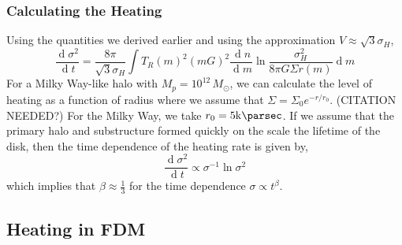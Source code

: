 \documentclass[usenatbib]{mnras}
\renewcommand{\d}[1]{\! \mathrm{d}#1 \:}
\newcommand{\deriv}[2]{\frac{\d{#1}}{\d{#2}}}
\renewcommand{\d}[1]{\ensuremath{\operatorname{d}\!{#1}}}
\begin{document}
\subsubsection{Calculating the Heating}
Using the quantities we derived earlier and using the approximation $V \approx \sqrt{3} \sigma_H$,
\begin{equation}
\deriv{\sigma^2}{t} = \frac{8 \pi}{\sqrt{3} \sigma_H} \int T_R(m)^2 (m G)^2 \deriv{n}{m}  \ln{\frac{\sigma_H^2}{8 \pi G \Sigma r(m)}} \d{m}
\end{equation}
For a Milky Way-like halo with $M_p = 10^{12} \, M_\odot$, we can calculate the level of heating as a function of radius where we assume that $\Sigma = \Sigma_0 e^{-r/r_0}$. (CITATION NEEDED?) For the Milky Way, we take $r_0 = 5 \si{\kilo\parsec}$. If we assume that the primary halo and substructure formed quickly on the scale the lifetime of the disk, then the time dependence of the heating rate is given by,
\begin{equation}
\deriv{\sigma^2}{t} \propto \sigma^{-1} \ln{\sigma^2} 
\end{equation} 
which implies that $\beta \approx \frac{1}{3}$ for the time dependence $\sigma \propto t^\beta$. 

\subsection{Heating in FDM}
\end{document}

